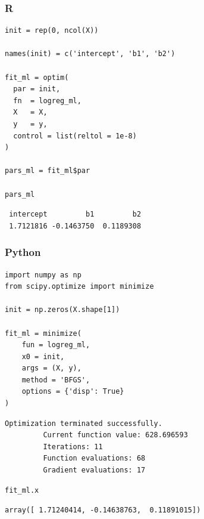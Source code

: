 \documentclass[
  letterpaper,
]{krantz}
\begin{document}
\subsubsection{R}

\begin{verbatim}
init = rep(0, ncol(X))

names(init) = c('intercept', 'b1', 'b2')

fit_ml = optim(
  par = init,
  fn  = logreg_ml,
  X   = X,
  y   = y,
  control = list(reltol = 1e-8)
)

pars_ml = fit_ml$par

pars_ml
\end{verbatim}

\begin{verbatim}
 intercept         b1         b2 
 1.7121816 -0.1463750  0.1189308 
\end{verbatim}

\subsubsection{Python}

\begin{verbatim}
import numpy as np
from scipy.optimize import minimize

init = np.zeros(X.shape[1])

fit_ml = minimize(
    fun = logreg_ml,
    x0 = init,
    args = (X, y),
    method = 'BFGS',
    options = {'disp': True}
)
\end{verbatim}

\begin{verbatim}
Optimization terminated successfully.
         Current function value: 628.696593
         Iterations: 11
         Function evaluations: 68
         Gradient evaluations: 17
\end{verbatim}

\begin{verbatim}
fit_ml.x
\end{verbatim}

\begin{verbatim}
array([ 1.71240414, -0.14638763,  0.11891015])
\end{verbatim}
\end{document}
